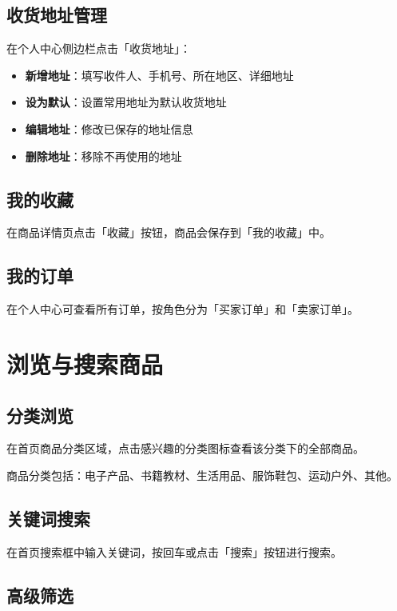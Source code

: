 \documentclass[12pt,a4paper,UTF8]{ctexart}
\begin{document}
\subsection{收货地址管理}

在个人中心侧边栏点击「收货地址」：
\begin{itemize}
    \item \textbf{新增地址}：填写收件人、手机号、所在地区、详细地址
    \item \textbf{设为默认}：设置常用地址为默认收货地址
    \item \textbf{编辑地址}：修改已保存的地址信息
    \item \textbf{删除地址}：移除不再使用的地址
\end{itemize}

\subsection{我的收藏}

在商品详情页点击「收藏」按钮，商品会保存到「我的收藏」中。

\subsection{我的订单}

在个人中心可查看所有订单，按角色分为「买家订单」和「卖家订单」。

\section{浏览与搜索商品}

\subsection{分类浏览}

在首页商品分类区域，点击感兴趣的分类图标查看该分类下的全部商品。

商品分类包括：电子产品、书籍教材、生活用品、服饰鞋包、运动户外、其他。

\subsection{关键词搜索}

在首页搜索框中输入关键词，按回车或点击「搜索」按钮进行搜索。

\subsection{高级筛选}
\end{document}

